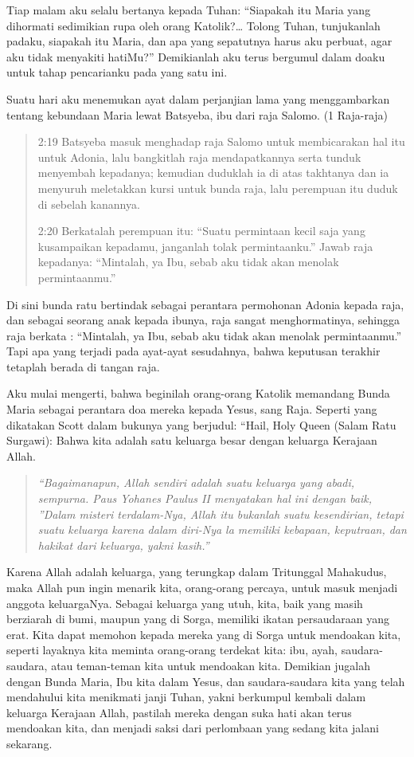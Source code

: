 Tiap malam aku selalu bertanya kepada Tuhan:
“Siapakah itu Maria yang dihormati sedimikian rupa oleh orang Katolik?… Tolong Tuhan, tunjukanlah padaku, siapakah itu Maria, dan apa yang sepatutnya harus aku perbuat, agar aku tidak menyakiti hatiMu?”
Demikianlah aku terus bergumul dalam doaku untuk tahap pencarianku pada yang satu ini.

Suatu hari aku menemukan ayat dalam perjanjian lama yang menggambarkan tentang kebundaan Maria lewat Batsyeba, ibu dari raja Salomo. (1 Raja-raja) 

\begin{quote}
2:19 Batsyeba masuk menghadap raja Salomo untuk membicarakan hal itu untuk Adonia, lalu bangkitlah raja mendapatkannya serta tunduk menyembah kepadanya; kemudian duduklah ia di atas takhtanya dan ia menyuruh meletakkan kursi untuk bunda raja, lalu perempuan itu duduk di sebelah kanannya.

2:20 Berkatalah perempuan itu: “Suatu permintaan kecil saja yang kusampaikan kepadamu, janganlah tolak permintaanku.” Jawab raja kepadanya: “Mintalah, ya Ibu, sebab aku tidak akan menolak permintaanmu.”
\end{quote}

Di sini bunda ratu bertindak sebagai perantara permohonan Adonia kepada raja, dan sebagai seorang anak kepada ibunya, raja sangat menghormatinya, sehingga raja berkata : “Mintalah, ya Ibu, sebab aku tidak akan menolak permintaanmu.” Tapi apa yang terjadi pada ayat-ayat sesudahnya, bahwa keputusan terakhir tetaplah berada di tangan raja.

Aku mulai mengerti, bahwa beginilah orang-orang Katolik memandang Bunda Maria sebagai perantara doa mereka kepada Yesus, sang Raja.
Seperti yang dikatakan Scott dalam bukunya yang berjudul: “Hail, Holy Queen (Salam Ratu Surgawi): Bahwa kita adalah satu keluarga besar dengan keluarga Kerajaan Allah.

\begin{quote}\emph{
“Bagaimanapun, Allah sendiri adalah suatu keluarga yang abadi, sempurna. Paus Yohanes Paulus II menyatakan hal ini dengan baik, ”Dalam misteri terdalam-Nya, Allah itu bukanlah suatu kesendirian, tetapi suatu keluarga karena dalam diri-Nya la memiliki kebapaan, keputraan, dan hakikat dari keluarga, yakni kasih.”}
\end{quote}

Karena Allah adalah keluarga, yang terungkap dalam Tritunggal Mahakudus, maka Allah pun ingin menarik kita, orang-orang percaya, untuk masuk menjadi anggota keluargaNya. Sebagai keluarga yang utuh, kita, baik yang masih berziarah di bumi, maupun yang di Sorga, memiliki ikatan persaudaraan yang erat. Kita dapat memohon kepada mereka yang di Sorga untuk mendoakan kita, seperti layaknya kita meminta orang-orang terdekat kita: ibu, ayah, saudara-saudara, atau teman-teman kita untuk mendoakan kita. Demikian jugalah dengan Bunda Maria, Ibu kita dalam Yesus, dan saudara-saudara kita yang telah mendahului kita menikmati janji Tuhan, yakni berkumpul kembali dalam keluarga Kerajaan Allah, pastilah mereka dengan suka hati akan terus mendoakan kita, dan menjadi saksi dari perlombaan yang sedang kita jalani sekarang.

